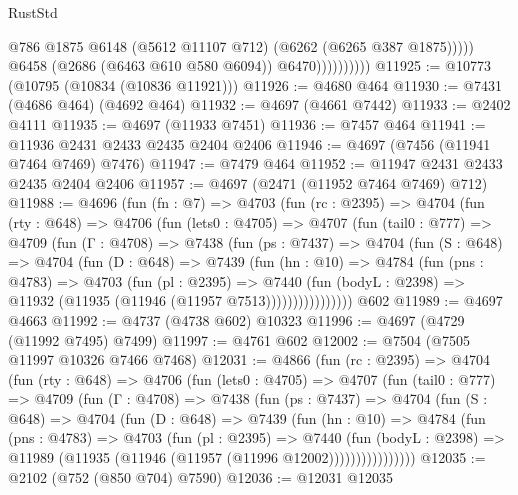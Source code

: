 \begin{lexlean}{RustStd}
\begin{coremodule}
                              @786
                              @1875
                              @6148
                              (@5612 @11107 @712)
                              (@6262 (@6265 @387 @1875)))))
                        @6458
                        (@2686 (@6463 @610 @580 @6094))
                        @6470))))))))))
@11925 := @10773 (@10795 (@10834 (@10836 @11921)))
@11926 := @4680 @464
@11930 := @7431 (@4686 @464) (@4692 @464)
@11932 := @4697 (@4661 @7442)
@11933 := @2402 @4111
@11935 := @4697 (@11933 @7451)
@11936 := @7457 @464
@11941 := @11936 @2431 @2433 @2435 @2404 @2406
@11946 := @4697 (@7456 (@11941 @7464 @7469) @7476)
@11947 := @7479 @464
@11952 := @11947 @2431 @2433 @2435 @2404 @2406
@11957 := @4697 (@2471 (@11952 @7464 @7469) @712)
@11988 := @4696
    (fun (fn : @7) =>
    @4703
      (fun (rc : @2395) =>
      @4704
        (fun (rty : @648) =>
        @4706
          (fun (lets0 : @4705) =>
          @4707
            (fun (tail0 : @777) =>
            @4709
              (fun (Γ : @4708) =>
              @7438
                (fun (ps : @7437) =>
                @4704
                  (fun (S : @648) =>
                  @4704
                    (fun (D : @648) =>
                    @7439
                      (fun (hn : @10) =>
                      @4784
                        (fun (pns : @4783) =>
                        @4703
                          (fun (pl : @2395) =>
                          @7440
                            (fun (bodyL : @2398) =>
                            @11932 (@11935 (@11946 (@11957 @7513))))))))))))))))
    @602
@11989 := @4697 @4663
@11992 := @4737 (@4738 @602) @10323
@11996 := @4697 (@4729 (@11992 @7495) @7499)
@11997 := @4761 @602
@12002 := @7504 (@7505 @11997 @10326 @7466 @7468)
@12031 := @4866
    (fun (rc : @2395) =>
    @4704
      (fun (rty : @648) =>
      @4706
        (fun (lets0 : @4705) =>
        @4707
          (fun (tail0 : @777) =>
          @4709
            (fun (Γ : @4708) =>
            @7438
              (fun (ps : @7437) =>
              @4704
                (fun (S : @648) =>
                @4704
                  (fun (D : @648) =>
                  @7439
                    (fun (hn : @10) =>
                    @4784
                      (fun (pns : @4783) =>
                      @4703
                        (fun (pl : @2395) =>
                        @7440
                          (fun (bodyL : @2398) =>
                          @11989 (@11935 (@11946 (@11957 (@11996 @12002))))))))))))))))
@12035 := @2102 (@752 (@850 @704) @7590)
@12036 := @12031 @12035

\end{coremodule}
\end{lexlean}
